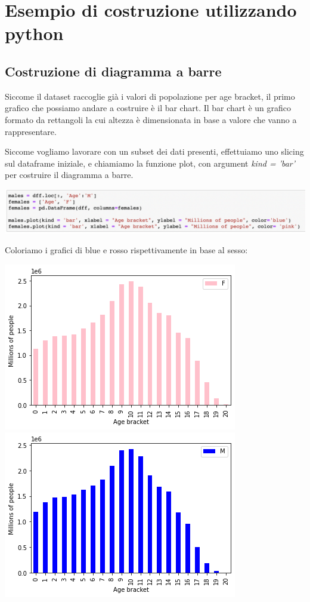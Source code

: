\documentclass[11pt, oneside]{article}   	%
\begin{document}
\section{Esempio di costruzione utilizzando python}

\subsection{Costruzione di diagramma a barre}
Siccome il dataset raccoglie già i valori di popolazione per age bracket, il primo grafico che possiamo andare a costruire è il bar chart. Il bar chart è un grafico formato da rettangoli la cui altezza è dimensionata in base a valore che vanno a rappresentare. 

Siccome vogliamo lavorare con un subset dei dati presenti, effettuiamo uno slicing sul dataframe iniziale, e chiamiamo la funzione plot, con argument \emph{kind = 'bar'} per costruire il diagramma a barre.
\begin{center}
\includegraphics[scale=0.6]{bar}
\end{center}
Coloriamo i grafici di blue e rosso rispettivamente in base al sesso:
\begin{center}
\includegraphics[scale=0.6]{females}
\includegraphics[scale=0.6]{males}
\end{center}
\end{document}

